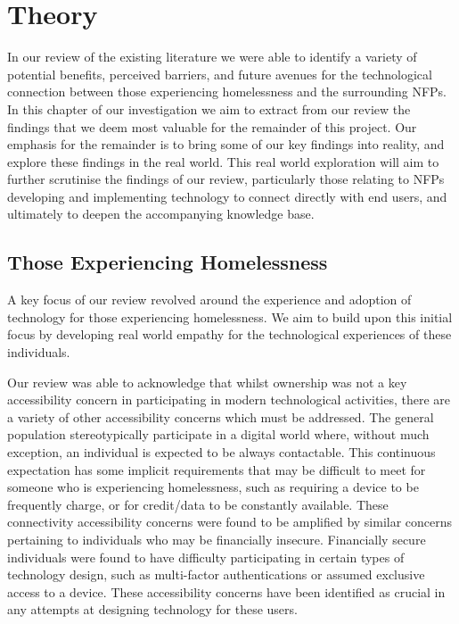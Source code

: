 \chapter{Theory}

In our review of the existing literature we were able to identify a variety of potential benefits, perceived barriers, and future avenues for the technological connection between those experiencing homelessness and the surrounding NFPs. In this chapter of our investigation we aim to extract from our review the findings that we deem most valuable for the remainder of this project. Our emphasis for the remainder is to bring some of our key findings into reality, and explore these findings in the real world. This real world exploration will aim to further scrutinise the findings of our review, particularly those relating to NFPs developing and implementing technology to connect directly with end users, and ultimately to deepen the accompanying knowledge base.

\section{Those Experiencing Homelessness}

A key focus of our review revolved around the experience and adoption of technology for those experiencing homelessness. We aim to build upon this initial focus by developing real world empathy for the technological experiences of these individuals.

Our review was able to acknowledge that whilst ownership was not a key accessibility concern in participating in modern technological activities, there are a variety of other accessibility concerns which must be addressed. The general population stereotypically participate in a digital world where, without much exception, an individual is expected to be always contactable. This continuous expectation has some implicit requirements that may be difficult to meet for someone who is experiencing homelessness, such as requiring a device to be frequently charge, or for credit/data to be constantly available. These connectivity accessibility concerns were found to be amplified by similar concerns pertaining to individuals who may be financially insecure. Financially secure individuals were found to have difficulty participating in certain types of technology design, such as multi-factor authentications or assumed exclusive access to a device. These accessibility concerns have been identified as crucial in any attempts at designing technology for these users.

